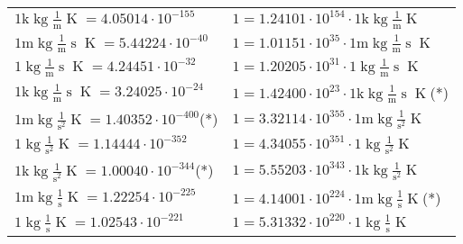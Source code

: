 \begin{center}
\begin{longtable}{l l}
{\color{gray}$1 \bm{\mathrm{ k}}\operatorname{kg}\frac1{\operatorname{m}}{}{}{\operatorname{K}} = 4.05014\cdot10^{-155} $}   & {\color{gray}$ 1 = 1.24101\cdot10^{154} \cdot 1 \bm{\mathrm{ k}}\operatorname{kg}\frac1{\operatorname{m}}{}{}{\operatorname{K}}$}  \\
{\color{gray}$1 \bm{\mathrm{ m}}\operatorname{kg}\frac1{\operatorname{m}}{\operatorname{s}}{}{\operatorname{K}} = 5.44224\cdot10^{-40} $}   & {\color{gray}$ 1 = 1.01151\cdot10^{35} \cdot 1 \bm{\mathrm{ m}}\operatorname{kg}\frac1{\operatorname{m}}{\operatorname{s}}{}{\operatorname{K}}$}  \\
{\color{black}$1 \bm{\mathrm{ }}\operatorname{kg}\frac1{\operatorname{m}}{\operatorname{s}}{}{\operatorname{K}} = 4.24451\cdot10^{-32} $}   & {\color{black}$ 1 = 1.20205\cdot10^{31} \cdot 1 \bm{\mathrm{ }}\operatorname{kg}\frac1{\operatorname{m}}{\operatorname{s}}{}{\operatorname{K}}$}  \\
{\color{gray}$1 \bm{\mathrm{ k}}\operatorname{kg}\frac1{\operatorname{m}}{\operatorname{s}}{}{\operatorname{K}} = 3.24025\cdot10^{-24} $}   & {\color{gray}$ 1 = 1.42400\cdot10^{23} \cdot 1 \bm{\mathrm{ k}}\operatorname{kg}\frac1{\operatorname{m}}{\operatorname{s}}{}{\operatorname{K}}$}\quad(*)\\
{\color{gray}$1 \bm{\mathrm{ m}}\operatorname{kg}{}\frac1{\operatorname{s}^2}{}{\operatorname{K}} = 1.40352\cdot10^{-400} $}\quad(*) & {\color{gray}$ 1 = 3.32114\cdot10^{355} \cdot 1 \bm{\mathrm{ m}}\operatorname{kg}{}\frac1{\operatorname{s}^2}{}{\operatorname{K}}$}  \\
{\color{black}$1 \bm{\mathrm{ }}\operatorname{kg}{}\frac1{\operatorname{s}^2}{}{\operatorname{K}} = 1.14444\cdot10^{-352} $}   & {\color{black}$ 1 = 4.34055\cdot10^{351} \cdot 1 \bm{\mathrm{ }}\operatorname{kg}{}\frac1{\operatorname{s}^2}{}{\operatorname{K}}$}  \\
{\color{gray}$1 \bm{\mathrm{ k}}\operatorname{kg}{}\frac1{\operatorname{s}^2}{}{\operatorname{K}} = 1.00040\cdot10^{-344} $}\quad(*) & {\color{gray}$ 1 = 5.55203\cdot10^{343} \cdot 1 \bm{\mathrm{ k}}\operatorname{kg}{}\frac1{\operatorname{s}^2}{}{\operatorname{K}}$}  \\
{\color{gray}$1 \bm{\mathrm{ m}}\operatorname{kg}{}\frac1{\operatorname{s}}{}{\operatorname{K}} = 1.22254\cdot10^{-225} $}   & {\color{gray}$ 1 = 4.14001\cdot10^{224} \cdot 1 \bm{\mathrm{ m}}\operatorname{kg}{}\frac1{\operatorname{s}}{}{\operatorname{K}}$}\quad(*)\\
{\color{black}$1 \bm{\mathrm{ }}\operatorname{kg}{}\frac1{\operatorname{s}}{}{\operatorname{K}} = 1.02543\cdot10^{-221} $}   & {\color{black}$ 1 = 5.31332\cdot10^{220} \cdot 1 \bm{\mathrm{ }}\operatorname{kg}{}\frac1{\operatorname{s}}{}{\operatorname{K}}$}  \\

\end{longtable}
\end{center}
